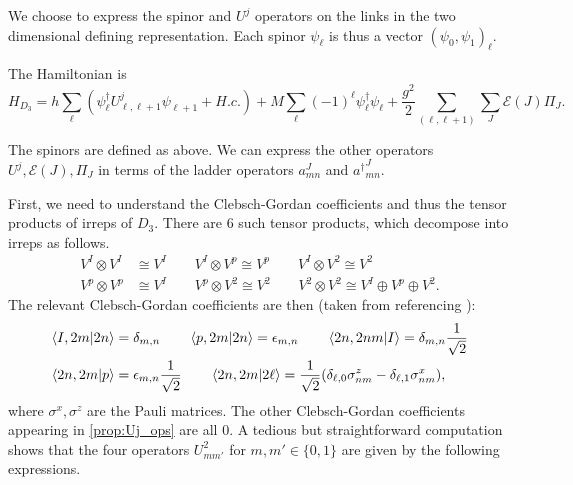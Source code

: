 \documentclass[11pt,reqno]{amsart}
\numberwithin{equation}{section}
\begin{document}
	We choose to express the spinor and $U^j$ operators on the links in the two dimensional defining representation.
	Each spinor $\psi_{\ell}$ is thus a vector $(\psi_0,\psi_1)_\ell$.
	
	The Hamiltonian is
	\begin{equation}
		H_{D_3}=h\sum_\ell (\psi_\ell^\dagger U_{\ell,\ell+1}^j\psi_{\ell+1}+H.c.) + M\sum_\ell (-1)^\ell \psi_\ell^\dagger\psi_\ell+ \frac{g^2}{2} \sum_{(\ell,\ell+1)} \sum_{J} \mathcal{E}(J)\Pi_J.
	\end{equation}
	
	The spinors are defined as above. 
	We can express the other operators $U^j, \mathcal{E}(J),\Pi_J$ in terms of the ladder operators $a^J_{mn}$ and ${a^\dagger}^J_{mn}$.
	
	First, we need to understand the Clebsch-Gordan coefficients and thus the tensor products of irreps of $D_3$. 
	There are 6 such tensor products, which decompose into irreps as follows.
	\begin{align}
		V^I \otimes V^I &\cong V^I \qquad V^I \otimes V^p \cong V^p \qquad V^I \otimes V^2 \cong V^2 \nonumber\\
		V^p \otimes V^p &\cong V^I \qquad V^p \otimes V^2 \cong V^2 \qquad V^2 \otimes V^2 \cong V^I \oplus V^p \oplus V^2.
	\end{align}
	The relevant Clebsch-Gordan coefficients are then (taken from \cite{ZoharBurrello15} referencing \cite{vDBC78}):
	\begin{align}
		\braket{I,2m}{2n} &= \delta_{m,n} \qquad \braket{p,2m}{2n} = \epsilon_{m,n} \qquad \braket{2n,2nm}{I}=\delta_{m,n}\frac{1}{\sqrt{2}} \nonumber\\
		\braket{2n,2m}{p} &= \epsilon_{m,n}\frac{1}{\sqrt{2}} \qquad \braket{2n,2m}{2\ell} =\frac{1}{\sqrt{2}}(\delta_{\ell,0}\sigma^z_{nm}-\delta_{\ell,1}\sigma^x_{nm}),
	\end{align}
	where $\sigma^x,\sigma^z$ are the Pauli matrices.
	The other Clebsch-Gordan coefficients appearing in \cref{prop:Uj_ops} are all 0.
	A tedious but straightforward computation shows that the four operators $U^2_{mm'}$ for $m,m' \in \{0,1\}$ are given by the following expressions.
\end{document}
